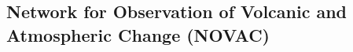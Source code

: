 \documentclass{beamer} %
\begin{document}
\subsection{Network for Observation of Volcanic and Atmospheric Change (NOVAC)}


\end{document}
